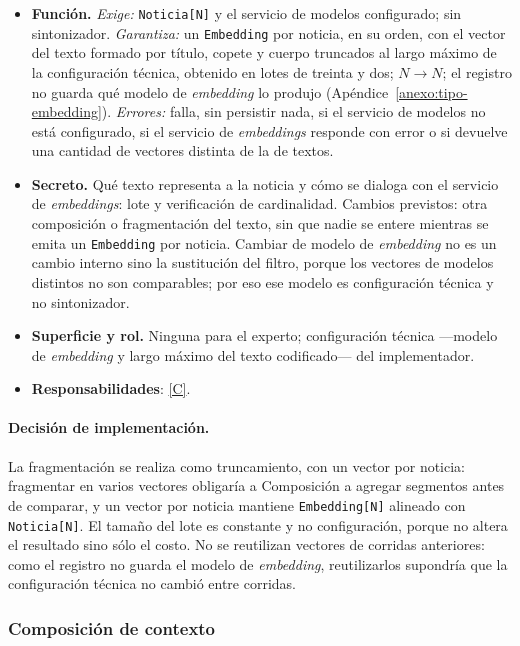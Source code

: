\documentclass[12pt]{report}
\DeclareRobustCommand{\resp}[1]{\hyperref[tab:registro-responsabilidades]{\textcolor{respcolor}{[#1]}}}
\begin{document}
\begin{itemize}
  \item \textbf{Función.} \textit{Exige:} \texttt{Noticia[N]} y el servicio de modelos configurado; sin sintonizador. \textit{Garantiza:} un \texttt{Embedding} por noticia, en su orden, con el vector del texto formado por título, copete y cuerpo truncados al largo máximo de la configuración técnica, obtenido en lotes de treinta y dos; \(N \to N\); el registro no guarda qué modelo de \textit{embedding} lo produjo (Apéndice~\ref{anexo:tipo-embedding}). \textit{Errores:} falla, sin persistir nada, si el servicio de modelos no está configurado, si el servicio de \textit{embeddings} responde con error o si devuelve una cantidad de vectores distinta de la de textos.
  \item \textbf{Secreto.} Qué texto representa a la noticia y cómo se dialoga con el servicio de \textit{embeddings}: lote y verificación de cardinalidad. Cambios previstos: otra composición o fragmentación del texto, sin que nadie se entere mientras se emita un \texttt{Embedding} por noticia. Cambiar de modelo de \textit{embedding} no es un cambio interno sino la sustitución del filtro, porque los vectores de modelos distintos no son comparables; por eso ese modelo es configuración técnica y no sintonizador.
  \item \textbf{Superficie y rol.} Ninguna para el experto; configuración técnica ---modelo de \textit{embedding} y largo máximo del texto codificado--- del implementador.
  \item \textbf{Responsabilidades}: \resp{C}.
\end{itemize}

\paragraph{Decisión de implementación.} La fragmentación se realiza como truncamiento, con un vector por noticia: fragmentar en varios vectores obligaría a Composición a agregar segmentos antes de comparar, y un vector por noticia mantiene \texttt{Embedding[N]} alineado con \texttt{Noticia[N]}. El tamaño del lote es constante y no configuración, porque no altera el resultado sino sólo el costo. No se reutilizan vectores de corridas anteriores: como el registro no guarda el modelo de \textit{embedding}, reutilizarlos supondría que la configuración técnica no cambió entre corridas.


\subsubsection{Composición de contexto}
\label{sec:impl-mat-composicion}
\end{document}
